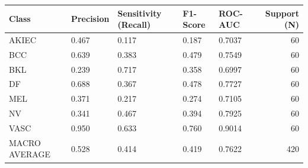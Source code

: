\begin{tabular}{lllllr}
\toprule
Class & Precision & Sensitivity (Recall) & F1-Score & ROC-AUC & Support (N) \\
\midrule
AKIEC & 0.467 & 0.117 & 0.187 & 0.7037 & 60 \\
BCC & 0.639 & 0.383 & 0.479 & 0.7549 & 60 \\
BKL & 0.239 & 0.717 & 0.358 & 0.6997 & 60 \\
DF & 0.688 & 0.367 & 0.478 & 0.7727 & 60 \\
MEL & 0.371 & 0.217 & 0.274 & 0.7105 & 60 \\
NV & 0.341 & 0.467 & 0.394 & 0.7925 & 60 \\
VASC & 0.950 & 0.633 & 0.760 & 0.9014 & 60 \\
MACRO AVERAGE & 0.528 & 0.414 & 0.419 & 0.7622 & 420 \\
\bottomrule
\end{tabular}
